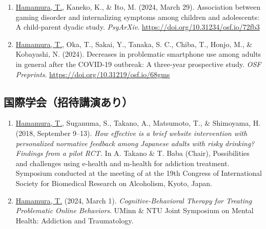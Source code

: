 \documentclass[11pt,a4paper]{article}
\begin{document}
\begin{enumerate}
	\item \underline{Hamamura, T.}, Kaneko, K., \& Ito, M. (2024, March 29). Association between gaming disorder and internalizing symptoms among children and adolescents: A child-parent dyadic study. \textit{PsyArXiv}. \url{https://doi.org/10.31234/osf.io/72fb3}
	\item \underline{Hamamura, T.}, Oka, T., Sakai, Y., Tanaka, S. C., Chiba, T., Honjo, M., \& Kobayashi, N. (2024). Decreases in problematic smartphone use among adults in general after the COVID-19 outbreak: A three-year prospective study. \textit{OSF Preprints}. \url{https://doi.org/10.31219/osf.io/68gms}
\end{enumerate}

\subsection{国際学会（招待講演あり）}
\begin{enumerate}
	\item \underline{Hamamura, T.}, Suganuma, S., Takano, A., Matsumoto, T., \& Shimoyama, H. (2018, September 9--13). \textit{How effective is a brief website intervention with personalized normative feedback among Japanese adults with risky drinking? Findings from a pilot RCT.} In A. Takano \& T. Baba (Chair), Possibilities and challenges using e-health and m-health for addiction treatment. Symposium conducted at the meeting of at the 19th Congress of International Society for Biomedical Research on Alcoholism, Kyoto, Japan.
	\item \underline{Hamamura, T.} (2024, March 1). \textit{Cognitive-Behavioral Therapy for Treating Problematic Online Behaviors}. UMinn \& NTU Joint Symposium on Mental Health: Addiction and Traumatology.
\end{enumerate}
\end{document}
